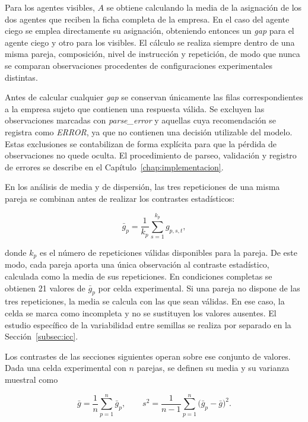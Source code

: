 Para los agentes visibles, $A$ se obtiene calculando la media de la asignación de los dos agentes que reciben la ficha completa de la empresa. En el caso del agente ciego se emplea directamente su asignación, obteniendo entonces un \textit{gap} para el agente ciego y otro para los visibles. El cálculo se realiza siempre dentro de una misma pareja, composición, nivel de instrucción y repetición, de modo que nunca se comparan observaciones procedentes de configuraciones experimentales distintas.

Antes de calcular cualquier \textit{gap} se conservan únicamente las filas correspondientes a la empresa sujeto que contienen una respuesta válida. Se excluyen las observaciones marcadas con \textit{parse\_error} y aquellas cuya recomendación se registra como \textit{ERROR}, ya que no contienen una decisión utilizable del modelo. Estas exclusiones se contabilizan de forma explícita para que la pérdida de observaciones no quede oculta. El procedimiento de parseo, validación y registro de errores se describe en el Capítulo~\ref{chap:implementacion}.

En los análisis de media y de dispersión, las tres repeticiones de una misma pareja se combinan antes de realizar los contrastes estadísticos:

\begin{equation}
	\bar{g}_{p} =
	\frac{1}{k_p}
	\sum_{s=1}^{k_p} g_{p,s,t},
	\label{eq:gap_seed_average}
\end{equation}

donde $k_p$ es el número de repeticiones válidas disponibles para la pareja. De este modo, cada pareja aporta una única observación al contraste estadístico, calculada como la media de sus repeticiones. En condiciones completas se obtienen 21 valores de $\bar{g}_{p}$ por celda experimental. Si una pareja no dispone de las tres repeticiones, la media se calcula con las que sean válidas. En ese caso, la celda se marca como incompleta y no se sustituyen los valores ausentes. El estudio específico de la variabilidad entre semillas se realiza por separado en la Sección~\ref{subsec:icc}.

Los contrastes de las secciones siguientes operan sobre ese conjunto de valores. Dada una celda experimental con $n$ parejas, se definen su media y su varianza muestral como

\begin{equation}
	\bar{g} = \frac{1}{n}\sum_{p=1}^{n}\bar{g}_{p},
	\qquad
	s^{2} = \frac{1}{n-1}\sum_{p=1}^{n}\bigl(\bar{g}_{p}-\bar{g}\bigr)^{2}.
	\label{eq:media_varianza_celda}
\end{equation}

